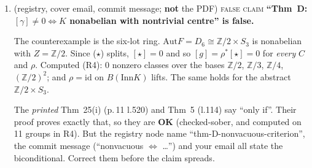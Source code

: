 \documentclass[11pt]{article}
\newcommand{\Z}{\mathbb{Z}}
\newcommand{\Inn}{\mathrm{Inn}}
\newcommand{\Out}{\mathrm{Out}}
\newcommand{\Aut}{\mathrm{Aut}}
\newcommand{\iss}[1]{\textsc{#1}}
\newcommand{\vd}[1]{\fbox{\textbf{#1}}}
\begin{document}
\begin{enumerate}[label=\textbf{N\arabic*},leftmargin=*]
\emph{Repair (computed to work).} Assume $\alpha:C\to B(\Aut K)$ is a strict functor, or carry
$(\alpha,k)$ throughout. Define a global inventory as
\[
\text{(D2)}\qquad \exists\,T:C\to BK\ \text{strict},\ \exists\,\mu:\mathrm{Ob}C\to\Aut K:\quad
\mu(y)\,\alpha(f)\,\mu(x)^{-1}=\mathrm{conj}(T f).
\]
Then on $B(\Z/2)$, D2 agrees with ``$\beta=0\wedge[g]=0$'' for \emph{every} strict $\alpha$ and every
$K\in\{D_4,Q_8,S_3,$ $\Z/2\times S_3,\Z/4\}$ (R5, 0 disagreements). Two further points for the proof:
\begin{itemize}[leftmargin=1.2em]
\item State that $[g]$ depends on the gauge $\mu$ only through the action of $\Aut K$ on $Z$. For a
one-object $C$, $\lambda$ can be any element of $\Out K$, so $\rho$ is defined only up to an outer
twist. Its \emph{vanishing} is well defined; the class is well defined only modulo
$\Aut(Z)$-action.
\item Delete or correct l.213 (``a global section realised on the nose''). In Giraud's theory the
band is \emph{part of the data} of a gerbe, not an obstruction to its neutrality. For example,
$\mathrm{Tors}(K_\alpha)$ is neutral with band $\beta\ne0$. What Cor.~17 really is: the two-stage
obstruction to lifting $\alpha$ through the crossed module $K\xrightarrow{\mathrm{conj}}\Aut K$,
i.e.\ through the Postnikov tower of the 2-group $\mathrm{AUT}(K)$ with $\pi_1=\Out K$ and
$\pi_2=Z$. Primary obstruction $\beta$, secondary obstruction $[g]$. That is classical too; cite it
as such (see N4).
\end{itemize}

\item \vd{MUST-FIX} (registry, cover email, commit message; \textbf{not} the PDF)
\iss{false claim} \textbf{``Thm~D: $[\gamma]\ne0\iff K$ nonabelian with nontrivial centre'' is
false.}

The counterexample is the six-lot ring. $\Aut F=D_6\cong\Z/2\times S_3$ is nonabelian with
$Z=\Z/2$. Since (\(\star\)) splits, $[\star]=0$ and so $[g]=\rho^*[\star]=0$ for \emph{every} $C$
and $\rho$. Computed (R4): 0 nonzero classes over the bases $\Z/2$, $\Z/3$, $\Z/4$, $(\Z/2)^2$;
and $\rho=\mathrm{id}$ on $B(\Inn K)$ lifts. The same holds for the abstract $\Z/2\times S_3$.

The \emph{printed} Thm~25(i) (p.\,11 l.520) and Thm~5 (l.114) say ``only if''. Their proof proves
exactly that, so they are \textbf{OK} (checked-sober, and computed on 11 groups in R4). But the
registry node name ``thm-D-nonvacuous-criterion'', the commit message (``nonvacuous $\iff$ \dots'')
and your email all state the biconditional. Correct them before the claim spreads.


\end{enumerate}
\end{document}
